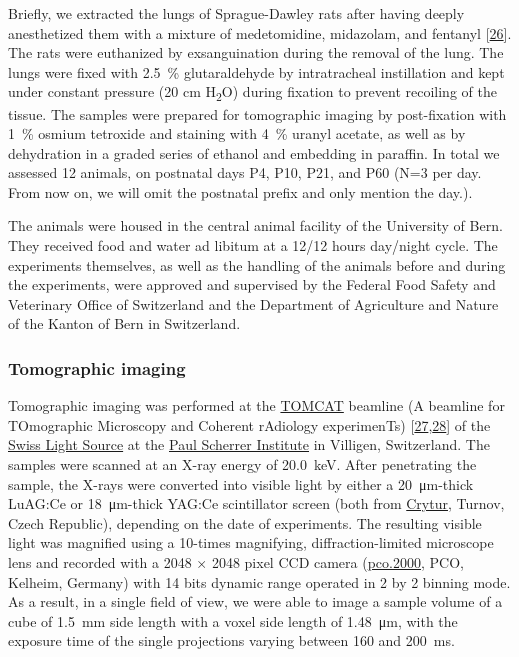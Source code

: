 \documentclass[
  american,
]{article}
\begin{document}
Briefly, we extracted the lungs of Sprague-Dawley rats after having deeply anesthetized them with a mixture of medetomidine, midazolam, and fentanyl {[}\protect\hyperlink{ref-IdRLVLjl}{26}{]}.
The rats were euthanized by exsanguination during the removal of the lung.
The lungs were fixed with 2.5~\% glutaraldehyde by intratracheal instillation and kept under constant pressure (20 cm H\textsubscript{2}O) during fixation to prevent recoiling of the tissue.
The samples were prepared for tomographic imaging by post-fixation with 1~\% osmium tetroxide and staining with 4~\% uranyl acetate, as well as by dehydration in a graded series of ethanol and embedding in paraffin.
In total we assessed 12 animals, on postnatal days P4, P10, P21, and P60 (N=3 per day.
From now on, we will omit the postnatal prefix and only mention the day.).

The animals were housed in the central animal facility of the University of Bern.
They received food and water ad libitum at a 12/12 hours day/night cycle.
The experiments themselves, as well as the handling of the animals before and during the experiments, were approved and supervised by the Federal Food Safety and Veterinary Office of Switzerland and the Department of Agriculture and Nature of the Kanton of Bern in Switzerland.

\hypertarget{tomographic-imaging}{%
\subsubsection{Tomographic imaging}\label{tomographic-imaging}}

Tomographic imaging was performed at the \href{https://www.psi.ch/sls/tomcat/}{TOMCAT} beamline (A beamline for TOmographic Microscopy and Coherent rAdiology experimenTs) {[}\protect\hyperlink{ref-knMAkPPz}{27},\protect\hyperlink{ref-Cp0VRmEj}{28}{]} of the \href{https://www.psi.ch/sls/}{Swiss Light Source} at the \href{https://www.psi.ch/}{Paul Scherrer Institute} in Villigen, Switzerland.
The samples were scanned at an X-ray energy of 20.0~keV.
After penetrating the sample, the X-rays were converted into visible light by either a 20~μm-thick LuAG:Ce or 18~μm-thick YAG:Ce scintillator screen (both from \href{http://www.crytur.cz/}{Crytur}, Turnov, Czech Republic), depending on the date of experiments.
The resulting visible light was magnified using a 10-times magnifying, diffraction-limited microscope lens and recorded with a 2048 × 2048 pixel CCD camera (\href{https://www.pco.de/specialized-cameras/pco2000/}{pco.2000}, PCO, Kelheim, Germany) with 14 bits dynamic range operated in 2 by 2 binning mode.
As a result, in a single field of view, we were able to image a sample volume of a cube of 1.5~mm side length with a voxel side length of 1.48~μm, with the exposure time of the single projections varying between 160 and 200~ms.
\end{document}
